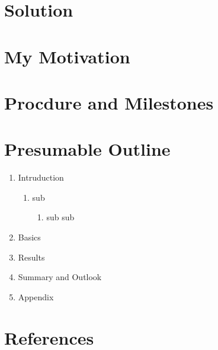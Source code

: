 \documentclass[a4paper,oneside,11pt]{article}
\begin{document}
\section{Solution}


\section{My Motivation}


\section{Procdure and Milestones}


\section{Presumable Outline}

\begin{enumerate}
\item Intruduction
	\begin{enumerate}
	\item sub
		\begin{enumerate}
		\item sub sub
		\end{enumerate}
	\end{enumerate}

\item Basics
\item Results
\item Summary and Outlook
\item Appendix

\end{enumerate}

\section*{References}
\end{document}
